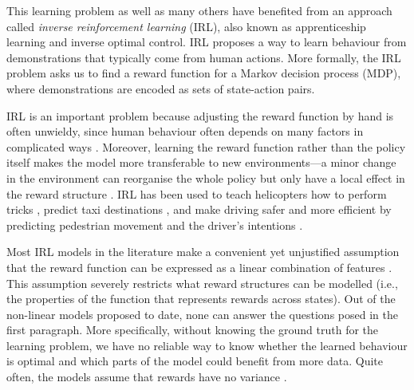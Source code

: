 \documentclass{mpaper}
\begin{document}
This learning problem
\cite{DBLP:journals/ijsr/KimP16,DBLP:journals/ijrr/KretzschmarSSB16} as well as
many others have benefited from an approach called \emph{inverse reinforcement
  learning} (IRL), also known as apprenticeship learning and inverse optimal
control. IRL proposes a way to learn behaviour from demonstrations that
typically come from human actions. More formally, the IRL problem asks us to
find a reward function for a Markov decision process (MDP), where demonstrations
are encoded as sets of state-action pairs.

IRL is an important problem because adjusting the reward function by hand is
often unwieldy, since human behaviour often depends on many factors in
complicated ways
\cite{DBLP:conf/icml/PieterN04}. Moreover,
learning the reward function rather than the policy itself makes the model more
transferable to new environments---a minor change in the environment can
reorganise the whole policy but only have a local effect in the reward structure
\cite{DBLP:conf/uai/JinDAS17,DBLP:conf/nips/LevinePK11}.
IRL has been used to teach helicopters how to perform tricks
\cite{DBLP:conf/nips/AbbeelCQN06}, predict taxi destinations
\cite{DBLP:conf/huc/ZiebartMDB08}, and make driving safer and more efficient by
predicting pedestrian movement \cite{DBLP:conf/iros/ZiebartRGMPBHDS09} and the
driver's intentions \cite{DBLP:conf/aaai/VogelRGR12}.

Most IRL models in the literature make a convenient yet unjustified
assumption that the reward function can be expressed as a linear combination of
features
\cite{DBLP:conf/icml/PieterN04,DBLP:conf/icml/NgR00,ziebart2008maximum}.
This assumption severely restricts what reward structures can be modelled (i.e.,
the properties of the function that represents rewards across states). Out of
the non-linear models proposed to date, none can answer the questions posed in
the first paragraph. More specifically, without knowing the ground truth for the
learning problem, we have no reliable way to know whether the learned behaviour
is optimal and which parts of the model could benefit from more data. Quite
often, the models assume that rewards have no variance
\cite{DBLP:conf/nips/LevinePK11,DBLP:conf/uai/JinDAS17}.
\end{document}
